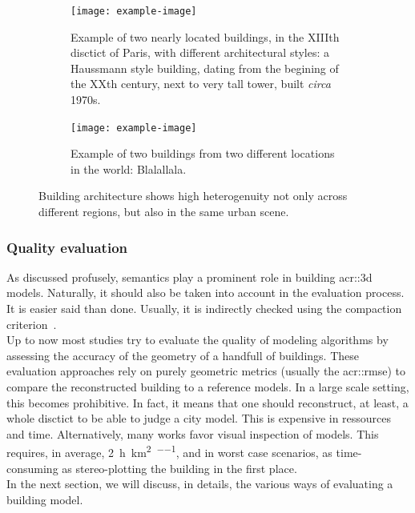             \begin{figure}[htpb]
                \begin{subfigure}{.48\textwidth}
                    \begin{center}
                        \texttt{[image: example-image]}
                        \caption{
                            \label{subfig::xiiith_paris_haussmann_tower} Example of two nearly located buildings, in the XIIIth disctict of Paris, with different architectural styles:
                            a Haussmann style building, dating from the begining of the XXth century, next to very tall tower, built \textit{circa} 1970s.
                        }
                    \end{center}
                \end{subfigure}
                \hfill
                \begin{subfigure}{.48\textwidth}
                    \begin{center}
                        \texttt{[image: example-image]}
                        \caption{
                            \label{subfig::different_regions} Example of two buildings from two different locations in the world:
                            Blalallala.
                        }
                    \end{center}
                \end{subfigure}
                \caption{
                    \label{fig::different_styles} Building architecture shows high heterogenuity not only across different regions, but also in the same urban scene.
                }
            \end{figure}
        
        \subsubsection{Quality evaluation}
            As discussed profusely, semantics play a prominent role in building \gls{acr::3d} models.
            Naturally, it should also be taken into account in the evaluation process.
            It is easier said than done.
            Usually, it is indirectly checked using the compaction criterion~\parencite{lafarge_ijcv12}.\\
            Up to now most studies try to evaluate the quality of modeling algorithms by assessing the accuracy of the geometry of a handfull of buildings.
            These evaluation approaches rely on purely geometric metrics (usually the \gls{acr::rmse}) to compare the reconstructed building to a reference models.
            In a large scale setting, this becomes prohibitive.
            In fact, it means that one should reconstruct, at least, a whole disctict to be able to judge a city model.
            This is expensive in ressources and time.
            Alternatively, many works favor visual inspection of models.
            This requires, in average, \SI[per-mode=repeated-symbol]{2}{\hour\per\km\squared\per\expert}, and in worst case scenarios, as time-consuming  as stereo-plotting the building in the first place.\\
            In the next section, we will discuss, in details, the various ways of evaluating a building model.

